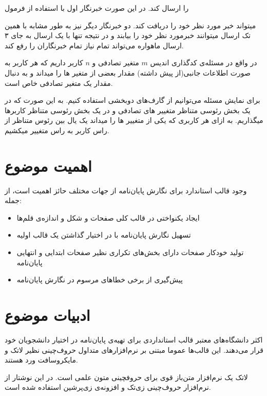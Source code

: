 را ارسال کند. در این صورت خبرنگار اول با استفاده از فرمول

میتواند خبر مورد نظر خود را دریافت کند. دو خبرنگار دیگر نیز به طور مشابه با همین تک ارسال میتوانند خبرمورد نظر خود را بیابند و در نتیجه تنها با یک ارسال به جای ۳ ارسال ماهواره می‌تواند تمام نیاز تمام خبرنگاران را رفع کند.

در واقع در مسئله‌ی کدگذاری اندیس
$m$
متغیر تصادفی و
$n$
کاربر داریم که هر کاربر به صورت اطلاعات جانبی(از پیش داشته) مقدار بعضی از متغیر ها را میداند و به دنبال مقدار یک متغیر تصادفی خاص است.

برای نمایش مسئله می‌توانیم از گارف‌های دوبخشی استفاده کنیم. به این صورت که در یک بخش رئوسی متناظر متغییر های تصادفی و در یک بخش رئوسی متناظر کاربرها میگذاریم. به ازای هر کاربری که یکی از متغییر ها را میداند یک یال بین رئوس متناظر از راس کاربر به راس متغییر میکشیم.



\section{اهمیت موضوع}

وجود قالب استاندارد برای نگارش پایان‌نامه از جهات مختلف حائز اهمیت است، از جمله:

\begin{itemize}
\item ایجاد یکنواختی در قالب کلی صفحات و شکل و اندازه‌ی قلم‌ها
\item تسهیل نگارش پایان‌نامه با در اختیار گذاشتن یک قالب اولیه
\item تولید خودکار صفحات دارای بخش‌های تکراری نظیر صفحات ابتدایی و انتهایی پایان‌نامه
\item پیش‌گیری از برخی خطاهای مرسوم در نگارش پایان‌نامه
\end{itemize}

\section{ادبیات موضوع}

اکثر دانشگاه‌های معتبر قالب استانداردی برای تهیه‌ی پایان‌نامه در اختیار دانشجویان خود قرار می‌دهند.
این قالب‌ها عموما مبتنی بر نرم‌افزارهای متداول حروف‌چینی نظیر لاتک و مایکروسافت ورد هستند.

 لاتک
 \LTRfootnote{\LaTeX}
  یک نرم‌افزار متن‌باز قوی برای حروفچینی متون علمی است.\cite
 {knuth1984texbook, lamport1985LaTeX}
در این نوشتار از نرم‌افزار حروف‌چینی زی‌تک
\LTRfootnote{\XeTeX}
 و افزونه‌ی زی‌پرشین
 \LTRfootnote{\XePersian}
 استفاده شده است.


